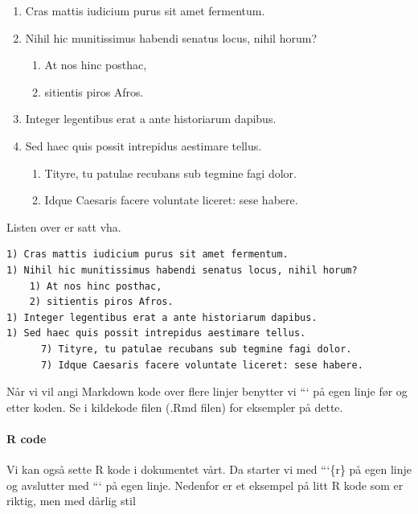 \documentclass[
]{article}
\providecommand{\tightlist}{%
  \setlength{\itemsep}{0pt}\setlength{\parskip}{0pt}}
\begin{document}
\begin{enumerate}
\def\labelenumi{\arabic{enumi})}
\item
  Cras mattis iudicium purus sit amet fermentum.
\item
  Nihil hic munitissimus habendi senatus locus, nihil horum?

  \begin{enumerate}
  \def\labelenumii{\arabic{enumii})}
  \tightlist
  \item
    At nos hinc posthac,
  \item
    sitientis piros Afros.
  \end{enumerate}
\item
  Integer legentibus erat a ante historiarum dapibus.
\item
  Sed haec quis possit intrepidus aestimare tellus.

  \begin{enumerate}
  \def\labelenumii{\arabic{enumii})}
  \setcounter{enumii}{6}
  \tightlist
  \item
    Tityre, tu patulae recubans sub tegmine fagi dolor.
  \item
    Idque Caesaris facere voluntate liceret: sese habere.
  \end{enumerate}
\end{enumerate}

Listen over er satt vha.

\begin{verbatim}
1) Cras mattis iudicium purus sit amet fermentum.
1) Nihil hic munitissimus habendi senatus locus, nihil horum?
    1) At nos hinc posthac,
    2) sitientis piros Afros.
1) Integer legentibus erat a ante historiarum dapibus.
1) Sed haec quis possit intrepidus aestimare tellus.
      7) Tityre, tu patulae recubans sub tegmine fagi dolor.
      7) Idque Caesaris facere voluntate liceret: sese habere.
\end{verbatim}

Når vi vil angi Markdown kode over flere linjer benytter vi ``` på egen
linje før og etter koden. Se i kildekode filen (.Rmd filen) for
eksempler på dette.

\hypertarget{r-code}{%
\paragraph{R code}\label{r-code}}

Vi kan også sette R kode i dokumentet vårt. Da starter vi med ```\{r\}
på egen linje og avslutter med ``` på egen linje. Nedenfor er et
eksempel på litt R kode som er riktig, men med dårlig stil
\end{document}
